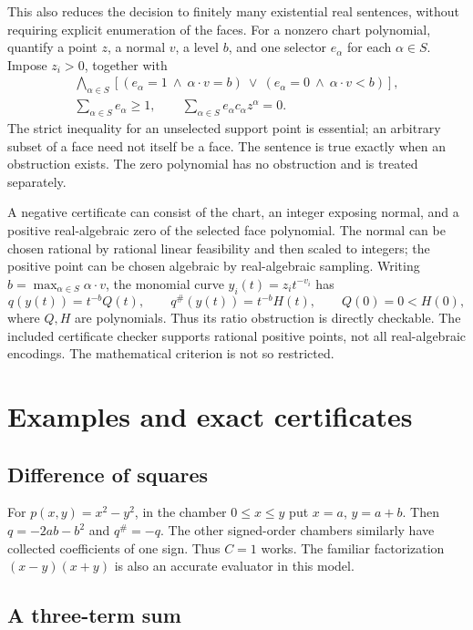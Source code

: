 \documentclass[11pt,a4paper]{article}
\theoremstyle{definition}
\theoremstyle{remark}
\newcommand{\maj}[1]{#1^{\#}}
\begin{document}
This also reduces the decision to finitely many existential real sentences,
without requiring explicit enumeration of the faces. For a nonzero chart
polynomial, quantify a point $z$, a normal $v$, a level $b$, and one selector
$e_\alpha$ for each $\alpha\in S$. Impose $z_i>0$, together with
\begin{gather*}
 \bigwedge_{\alpha\in S}
 \left[(e_\alpha=1\ \wedge\ \alpha\cdot v=b)
 \ \vee\ (e_\alpha=0\ \wedge\ \alpha\cdot v<b)\right],\\
 \sum_{\alpha\in S}e_\alpha\ge1,\qquad
 \sum_{\alpha\in S}e_\alpha c_\alpha z^\alpha=0.
\end{gather*}
The strict inequality for an unselected support point is essential; an
arbitrary subset of a face need not itself be a face. The sentence is true
exactly when an obstruction exists. The zero polynomial has no obstruction
and is treated separately.

A negative certificate can consist of the chart, an integer exposing normal,
and a positive real-algebraic zero of the selected face polynomial. The normal
can be chosen rational by rational linear feasibility and then scaled to
integers; the positive point can be chosen algebraic by real-algebraic
sampling. Writing $b=\max_{\alpha\in S}\alpha\cdot v$, the monomial curve
$y_i(t)=z_i t^{-v_i}$ has
\[
 q(y(t))=t^{-b}Q(t),\qquad \maj q(y(t))=t^{-b}H(t),
 \qquad Q(0)=0<H(0),
\]
where $Q,H$ are polynomials. Thus its ratio obstruction is directly checkable.
The included certificate checker supports rational positive points, not all
real-algebraic encodings. The mathematical criterion is not so restricted.

\section{Examples and exact certificates}

\subsection{Difference of squares}

For $p(x,y)=x^2-y^2$, in the chamber $0\le x\le y$ put $x=a$, $y=a+b$.
Then $q=-2ab-b^2$ and $\maj q=-q$. The other signed-order chambers similarly
have collected coefficients of one sign. Thus $C=1$ works. The familiar
factorization $(x-y)(x+y)$ is also an accurate evaluator in this model.

\subsection{A three-term sum}
\end{document}
